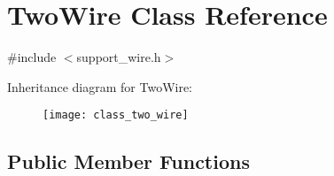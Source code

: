 \hypertarget{class_two_wire}{}\section{Two\+Wire Class Reference}
\label{class_two_wire}


{\ttfamily \#include $<$support\+\_\+wire.\+h$>$}

Inheritance diagram for Two\+Wire\+:\begin{figure}[H]
\begin{center}
\leavevmode
\texttt{[image: class\_two\_wire]}
\end{center}
\end{figure}
\subsection*{Public Member Functions}
